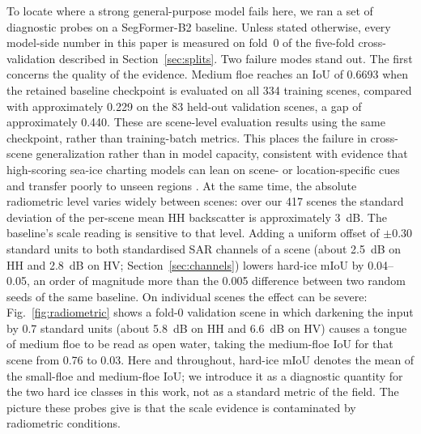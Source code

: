 \documentclass[preprint,12pt,authoryear]{elsarticle}
\begin{document}
To locate where a strong general-purpose model fails here, we ran a set of
diagnostic probes on a SegFormer-B2 baseline. Unless stated otherwise, every
model-side number in this paper is measured on fold~0 of the five-fold
cross-validation described in Section~\ref{sec:splits}. Two failure modes stand
out. The first concerns the quality of the evidence. Medium floe reaches
an IoU of 0.6693 when the retained baseline checkpoint is evaluated on all
334 training scenes, compared with approximately 0.229 on the 83 held-out
validation scenes, a gap of approximately 0.440. These are scene-level
evaluation results using the same checkpoint, rather than training-batch
metrics. This places the failure in
cross-scene generalization rather than in model capacity, consistent with
evidence that high-scoring sea-ice charting models can lean on scene- or
location-specific cues and transfer poorly to unseen regions
\citep{jalayer2025enhancing}. At the same time, the absolute radiometric level
varies widely between scenes: over our 417 scenes the standard deviation of the
per-scene mean HH backscatter is approximately 3~dB. The baseline's scale
reading is sensitive to that level. Adding a uniform offset of $\pm0.30$
standard units to both standardised SAR channels of a scene (about 2.5~dB on HH
and 2.8~dB on HV; Section~\ref{sec:channels}) lowers hard-ice mIoU by
0.04--0.05, an order of magnitude more than the 0.005 difference between two
random seeds of the same baseline. On individual
scenes the effect can be severe: Fig.~\ref{fig:radiometric} shows a fold-0
validation scene in which darkening the input by 0.7 standard units (about
5.8~dB on HH and 6.6~dB on HV) causes a tongue of
medium floe to be read as open water, taking the medium-floe IoU for that scene
from 0.76 to 0.03.
Here and throughout, hard-ice mIoU
denotes the mean of the small-floe and medium-floe IoU; we introduce it as a
diagnostic quantity for the two hard ice classes in this work, not as a
standard metric of the field. The picture these probes give is that the scale
evidence is contaminated by radiometric conditions.
\end{document}
